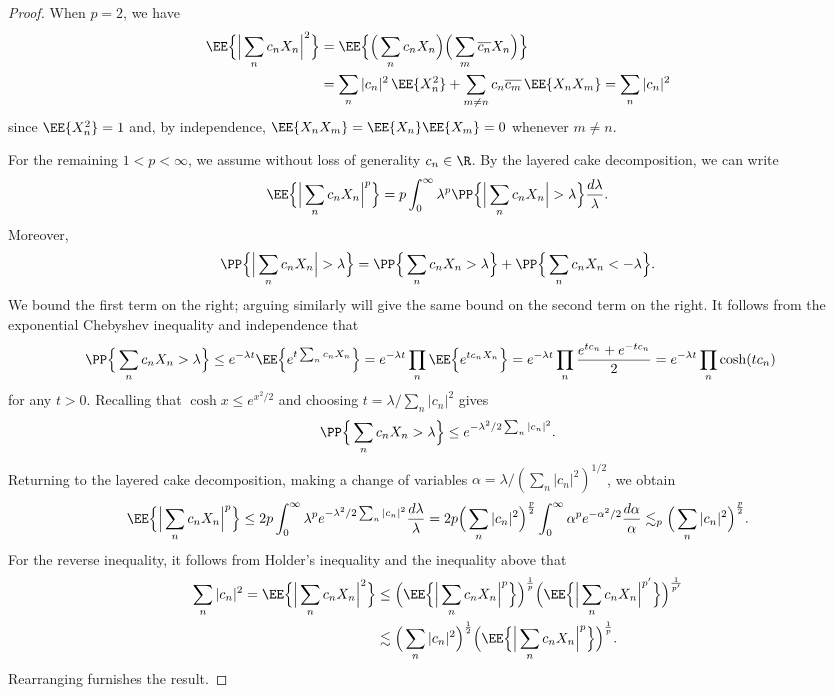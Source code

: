 \begin{proof}
	When $p = 2$, we have
		\begin{align*}
			 \EE \Big\{ \Big| \sum_n c_n X_n \Big|^2\Big\}
			 	&= \EE \Big\{ \Big( \sum_n c_n X_n \Big)\Big( \sum_m \overline{c_n} X_n \Big)\Big\} \\
			 	&= \sum_n |c_n|^2 \, \EE \{ X_n^2 \} + \sum_{m \neq n} c_n \overline{c_m} \, \EE\{X_n X_m\} = \sum_n |c_n|^2
		\end{align*}
	since $\EE\{X_n^2\} = 1$ and, by independence, $\EE \{X_n X_m\} = \EE \{X_n\} \EE \{X_m\} = 0$ whenever $m \neq n$. 	
	
	For the remaining $1 < p < \infty$, we assume without loss of generality $c_n \in \R$. By the layered cake decomposition, we can write
		\[ \EE \Big\{ \Big| \sum_n c_n X_n \Big|^p \Big\} = p \int_0^\infty \lambda^p \PP \Big\{ \Big| \sum_n c_n X_n \Big| > \lambda \Big\} \frac{d\lambda}{\lambda}. \]
	Moreover, 
		\[  \PP \Big\{ \Big| \sum_n c_n X_n \Big| > \lambda \Big\} = \PP \Big\{ \sum_n c_n X_n  > \lambda \Big\} + \PP \Big\{  \sum_n c_n X_n < - \lambda \Big\}. \]	
	We bound the first term on the right; arguing similarly will give the same bound on the second term on the right. It follows from the exponential Chebyshev inequality and independence that
		\begin{align*}
			\PP \Big\{ \sum_n c_n X_n  > \lambda \Big\}
				&\leq e^{-\lambda t} \EE \Big\{ e^{t \sum_n c_n X_n} \Big\} = e^{-\lambda t} \prod_n \EE \Big\{ e^{t c_n X_n} \Big\} =e^{-\lambda t} \prod_n \frac{e^{t c_n} + e^{- t c_n}}{2} = e^{-\lambda t} \prod_n \cosh (tc_n)
		\end{align*}	
	for any $t > 0$. Recalling that $\cosh x \leq e^{x^2/2}$	and choosing $t = \lambda /\sum_n |c_n|^2$ gives
		\[ \PP \Big\{ \sum_n c_n X_n  > \lambda \Big\} \leq  e^{-\lambda^2/2\sum_n |c_n|^2} .\]
	Returning to the layered cake decomposition, making a change of variables $\alpha = \lambda /(\sum_n |c_n|^2)^{1/2}$, we obtain
		\[  \EE \Big\{ \Big| \sum_n c_n X_n \Big|^p \Big\} \leq 2p \int_0^\infty \lambda^p e^{-\lambda^2/2 \sum_n |c_n|^2} \frac{d\lambda}{\lambda} = 2p \Big(\sum_n |c_n|^2 \Big)^{\frac{p}{2}} \int_0^\infty \alpha^p e^{-\alpha^2/2} \frac{d\alpha}{\alpha} \lesssim_p \Big(\sum_n |c_n|^2 \Big)^{\frac{p}{2}}. \]	
	For the reverse inequality, it follows from Holder's inequality and the inequality above that
		\begin{align*}
			 \sum_n |c_n|^2 = \EE \Big\{ \Big| \sum_n c_n X_n \Big|^2 \Big\} &\leq \Big( \EE \Big\{ \Big|\sum_n c_n X_n \Big|^p \Big\} \Big)^\frac1p \Big( \EE \Big\{ \Big|\sum_n c_n X_n \Big|^{p'} \Big\} \Big)^\frac{1}{p'} \\
			 & \lesssim \Big(\sum_n |c_n|^2 \Big)^\frac12 \Big( \EE \Big\{ \Big|\sum_n c_n X_n \Big|^p \Big\} \Big)^\frac1p.  
		\end{align*}	 
	Rearranging furnishes the result. 	 
\end{proof}


